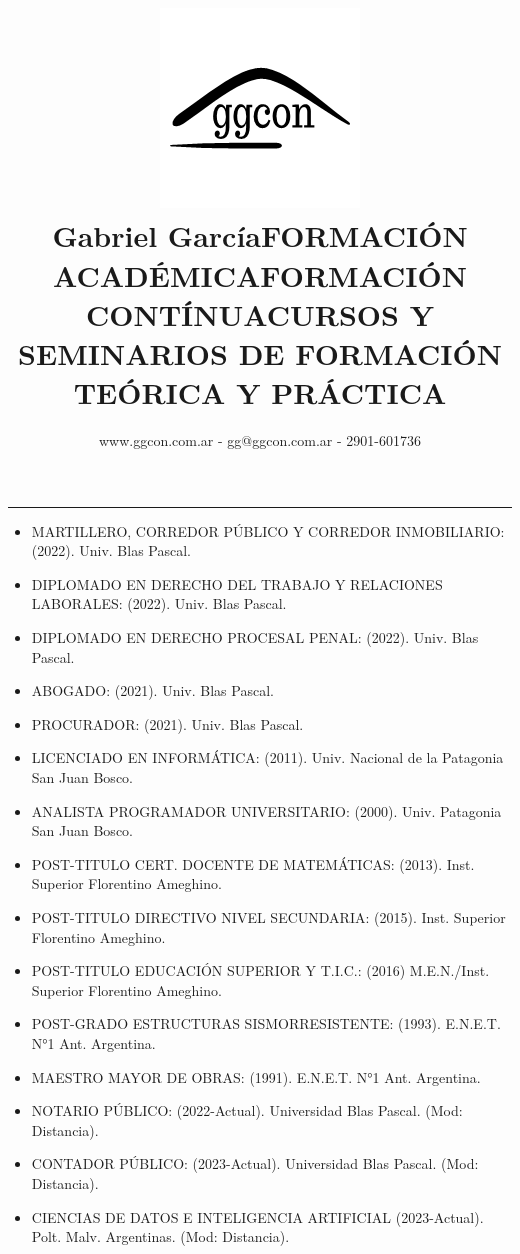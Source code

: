 \documentclass[a4paper,oneside,9pt]{article}
\title{ \includegraphics[scale=0.33]{img/logo ggcon.png} \\ \bf Gabriel García}
\author{www.ggcon.com.ar - gg@ggcon.com.ar - 2901-601736}
\date{}
\begin{document}
\maketitle  
\hrule

\begin{center}
    \title{FORMACIÓN ACADÉMICA}   
\end{center}

\begin{itemize}
    \item MARTILLERO, CORREDOR PÚBLICO Y CORREDOR INMOBILIARIO: (2022). Univ. Blas Pascal.
    \item DIPLOMADO EN DERECHO DEL TRABAJO Y RELACIONES LABORALES: (2022). Univ. Blas Pascal.
    \item DIPLOMADO EN DERECHO PROCESAL PENAL: (2022). Univ. Blas Pascal.
    \item ABOGADO: (2021). Univ. Blas Pascal.
    \item PROCURADOR: (2021). Univ. Blas Pascal.
    \item LICENCIADO EN INFORMÁTICA: (2011). Univ. Nacional de la Patagonia San Juan Bosco.
    \item ANALISTA PROGRAMADOR UNIVERSITARIO: (2000). Univ. Patagonia San Juan Bosco.
    \item POST-TITULO CERT. DOCENTE DE MATEMÁTICAS: (2013). Inst. Superior Florentino Ameghino.
    \item POST-TITULO DIRECTIVO NIVEL SECUNDARIA: (2015). Inst. Superior Florentino Ameghino.
    \item POST-TITULO EDUCACIÓN SUPERIOR Y T.I.C.: (2016) M.E.N./Inst. Superior Florentino Ameghino.
    \item POST-GRADO ESTRUCTURAS SISMORRESISTENTE: (1993). E.N.E.T. N°1 Ant. Argentina.
    \item MAESTRO MAYOR DE OBRAS: (1991). E.N.E.T. N°1 Ant. Argentina.
\end{itemize}
\begin{center}
    \title{FORMACIÓN CONTÍNUA}   
\end{center}

\begin{itemize}
    \item NOTARIO PÚBLICO: (2022-Actual). Universidad Blas Pascal. (Mod: Distancia).
    \item CONTADOR PÚBLICO: (2023-Actual). Universidad Blas Pascal. (Mod: Distancia).
    \item CIENCIAS DE DATOS E INTELIGENCIA ARTIFICIAL (2023-Actual). Polt. Malv. Argentinas. (Mod: Distancia).
\end{itemize}
\begin{center}
    \title{CURSOS Y SEMINARIOS DE FORMACIÓN TEÓRICA Y PRÁCTICA}   
\end{center}
\end{document}
